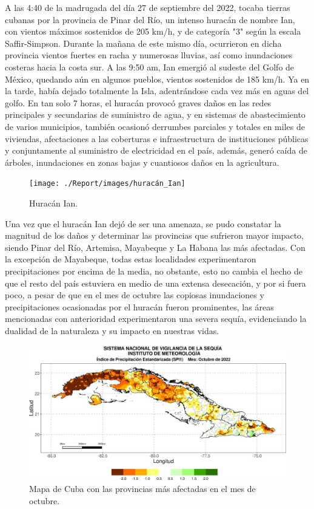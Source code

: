 \documentclass[12pt]{article}
\begin{document}
	
	A las 4:40 de la madrugada del día 27 de septiembre del 2022, tocaba tierras cubanas por la provincia de Pinar del Río, un intenso huracán de nombre Ian, con vientos máximos sostenidos de 205 km/h, y de categoría "3" según la escala Saffir-Simpson. Durante la mañana de este mismo día, ocurrieron en dicha provincia vientos fuertes en racha y numerosas lluvias, así como inundaciones costeras hacia la costa sur. A las 9:50 am, Ian emergió al sudeste del Golfo de México, quedando aún en algunos pueblos, vientos sostenidos de 185 km/h. Ya en la tarde, había dejado totalmente la Isla, adentrándose cada vez más en aguas del golfo. En tan solo 7 horas, el huracán provocó graves daños en las redes principales y secundarias de suministro de agua, y en sistemas de abastecimiento de varios municipios, también ocasionó derrumbes parciales y totales en miles de viviendas, afectaciones a las coberturas e infraestructura de instituciones públicas y conjuntamente al suministro de electricidad en el país, además, generó caída de árboles, inundaciones en zonas bajas y cuantiosos daños en la agricultura.\cite{webpage1}
	
	
	\begin{figure}[H]
		\centering
		\texttt{[image: ./Report/images/huracán\_Ian]}
		\caption{Huracán Ian.}
		\label{fig:huracanian}
	\end{figure}
	
	Una vez que el huracán Ian dejó de ser una amenaza, se pudo constatar la magnitud de los daños y determinar las provincias que sufrieron mayor impacto, siendo Pinar del Río, Artemisa, Mayabeque y La Habana las más afectadas. Con la excepción de Mayabeque, todas estas localidades experimentaron precipitaciones por encima de la media, no obstante, esto no cambia el hecho de que el resto del país estuviera en medio de una extensa desecación, y por si fuera poco, a pesar de que en el mes de octubre las copiosas inundaciones y precipitaciones ocasionadas por el huracán fueron prominentes, las áreas mencionadas con anterioridad experimentaron una severa sequía, evidenciando la dualidad de la naturaleza y su impacto en nuestras vidas.\cite{webpage2}
	
	
	
	\begin{figure}[H]
		\centering
		\includegraphics[width=0.8\linewidth]{./Report/images/mapa_octubre_ismet}
		\caption{Mapa de Cuba con las provincias más afectadas en el mes de octubre.}
		\label{fig:mapaoctubreismet}
	\end{figure}
	
\end{document}
